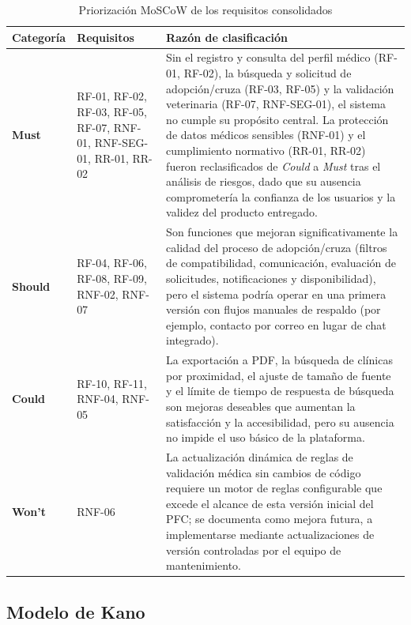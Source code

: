 \documentclass[journal,onecolumn]{IEEEtran}
\begin{document}
\begin{table}[H]
\caption{Priorización MoSCoW de los requisitos consolidados}
\label{tab:moscow}
\begin{tabularx}{\textwidth}{|l|X|X|}
\hline
\textbf{Categoría} & \textbf{Requisitos} & \textbf{Razón de clasificación} \\
\hline
\textbf{Must} & RF-01, RF-02, RF-03, RF-05, RF-07, RNF-01, RNF-SEG-01, RR-01, RR-02 &
Sin el registro y consulta del perfil médico (RF-01, RF-02), la búsqueda y
solicitud de adopción/cruza (RF-03, RF-05) y la validación veterinaria
(RF-07, RNF-SEG-01), el sistema no cumple su propósito central. La
protección de datos médicos sensibles (RNF-01) y el cumplimiento normativo
(RR-01, RR-02) fueron reclasificados de \textit{Could} a \textit{Must}
tras el análisis de riesgos, dado que su ausencia comprometería la
confianza de los usuarios y la validez del producto entregado. \\
\hline
\textbf{Should} & RF-04, RF-06, RF-08, RF-09, RNF-02, RNF-07 &
Son funciones que mejoran significativamente la calidad del proceso de
adopción/cruza (filtros de compatibilidad, comunicación, evaluación de
solicitudes, notificaciones y disponibilidad), pero el sistema podría
operar en una primera versión con flujos manuales de respaldo (por
ejemplo, contacto por correo en lugar de chat integrado). \\
\hline
\textbf{Could} & RF-10, RF-11, RNF-04, RNF-05 &
La exportación a PDF, la búsqueda de clínicas por proximidad, el ajuste de
tamaño de fuente y el límite de tiempo de respuesta de búsqueda son
mejoras deseables que aumentan la satisfacción y la accesibilidad, pero su
ausencia no impide el uso básico de la plataforma. \\
\hline
\textbf{Won't} & RNF-06 &
La actualización dinámica de reglas de validación médica sin cambios de
código requiere un motor de reglas configurable que excede el alcance de
esta versión inicial del PFC; se documenta como mejora futura, a
implementarse mediante actualizaciones de versión controladas por el
equipo de mantenimiento. \\
\hline
\end{tabularx}
\end{table}

\subsection{Modelo de Kano}
\end{document}
